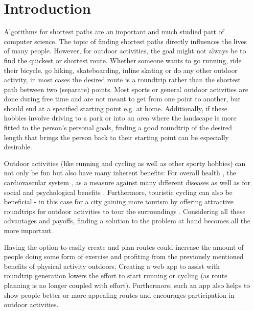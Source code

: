 \chapter{Introduction}
\label{chapter:introduction}


Algorithms for shortest paths are an important and much studied part of computer science.
The topic of finding shortest paths directly influences the lives of many people.
However, for outdoor activities, the goal might not always be to find the quickest or shortest route.
Whether someone wants to go running, ride their bicycle, go hiking, skateboarding, inline skating or do any other outdoor activity, in most cases the desired route is a roundtrip rather than the shortest path between two (separate) points.
Most sports or general outdoor activities are done during free time and are not meant to get from one point to another, but should end at a specified starting point e.g. at home.
Additionally, if these hobbies involve driving to a park or into an area where the landscape is more fitted to the person's personal goals, finding a good roundtrip of the desired length that brings the person back to their starting point can be especially desirable.


Outdoor activities (like running and cycling as well as other sporty hobbies) can not only be fun but also have many inherent benefits: 
For overall health \cite{oja_health_2011, ruegsegger_health_2018, vina_exercise_2012}, the cardiovascular system \cite{nystoriak_cardiovascular_2018}, as a measure against many different diseases \cite{oja_health_2011} as well as for social \cite{mueller_jogging_2007, obrien_jogging_2007, wankel_psychological_1990} and psychological benefits \cite{biddle_psychological_1993, cekin_psychological_2015, szabo_psychological_2013, wankel_psychological_1990}. 
Furthermore, touristic cycling can also be beneficial - in this case for a city gaining more tourism by offering attractive roundtrips for outdoor activities to tour the surroundings \cite{blondiau_economic_2016}.
Considering all these advantages and payoffs, finding a solution to the problem at hand becomes all the more important.

Having the option to easily create and plan routes could increase the amount of people doing some form of exercise and profiting from the previously mentioned benefits of physical activity outdoors.
Creating a web app to assist with roundtrip generation lowers the effort to start running or cycling (as route planning is no longer coupled with effort).
Furthermore, such an app also helps to show people better or more appealing routes and encourages participation in outdoor activities.

